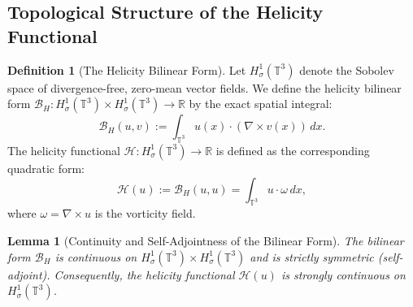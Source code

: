 \documentclass[12pt,a4paper]{article}
\theoremstyle{plain}
\newtheorem{lemma}[theorem]{Lemma}
\theoremstyle{definition}
\newtheorem{definition}[theorem]{Definition}
\theoremstyle{remark}
\newcommand{\T}{\mathbb{T}}
\newcommand{\R}{\mathbb{R}}
\begin{document}
\subsection{Topological Structure of the Helicity Functional}

\begin{definition}[The Helicity Bilinear Form]
\label{def:helicity_bilinear}
Let $H^1_\sigma(\T^3)$ denote the Sobolev space of divergence-free, zero-mean vector fields. We define the helicity bilinear form $\mathcal{B}_H : H^1_\sigma(\T^3) \times H^1_\sigma(\T^3) \to \R$ by the exact spatial integral:
\[
  \mathcal{B}_H(u, v) := \int_{\T^3} u(x) \cdot (\nabla \times v(x)) \,dx.
\]
The helicity functional $\mathcal{H} : H^1_\sigma(\T^3) \to \R$ is defined as the corresponding quadratic form:
\[
  \mathcal{H}(u) := \mathcal{B}_H(u, u) = \int_{\T^3} u \cdot \omega \,dx,
\]
where $\omega = \nabla \times u$ is the vorticity field.
\end{definition}

\begin{lemma}[Continuity and Self-Adjointness of the Bilinear Form]
\label{lem:helicity_continuity}
The bilinear form $\mathcal{B}_H$ is continuous on $H^1_\sigma(\T^3) \times H^1_\sigma(\T^3)$ and is strictly symmetric (self-adjoint). Consequently, the helicity functional $\mathcal{H}(u)$ is strongly continuous on $H^1_\sigma(\T^3)$.
\end{lemma}
\end{document}
